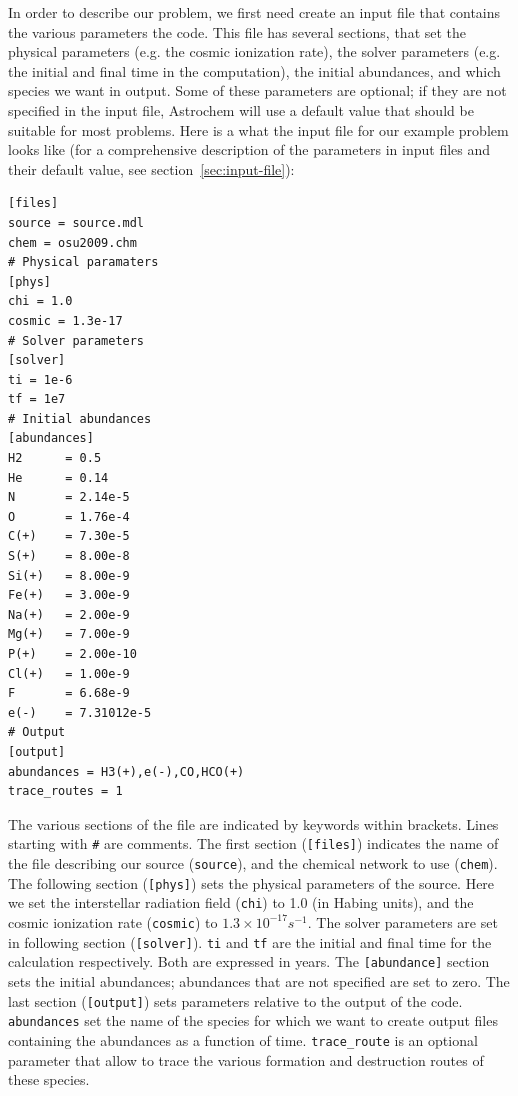 \documentclass[a4paper,12pt]{article}
\begin{document}
In order to describe our problem, we first need create an input file
that contains the various parameters the code. This file has several
sections, that set the physical parameters (e.g. the cosmic ionization
rate), the solver parameters (e.g. the initial and final time in the
computation), the initial abundances, and which species we want in
output. Some of these parameters are optional; if they are not
specified in the input file, Astrochem will use a default value that
should be suitable for most problems. Here is a what the input file
for our example problem looks like (for a comprehensive description of
the parameters in input files and their default value, see
section~\ref{sec:input-file}):

\begin{verbatim}
[files]
source = source.mdl
chem = osu2009.chm
# Physical paramaters
[phys]
chi = 1.0
cosmic = 1.3e-17
# Solver parameters
[solver]
ti = 1e-6
tf = 1e7
# Initial abundances
[abundances]
H2      = 0.5
He      = 0.14
N       = 2.14e-5
O       = 1.76e-4
C(+)    = 7.30e-5
S(+)    = 8.00e-8
Si(+)   = 8.00e-9
Fe(+)   = 3.00e-9
Na(+)   = 2.00e-9
Mg(+)   = 7.00e-9
P(+)    = 2.00e-10
Cl(+)   = 1.00e-9
F       = 6.68e-9
e(-)    = 7.31012e-5
# Output
[output]
abundances = H3(+),e(-),CO,HCO(+)
trace_routes = 1
\end{verbatim}

The various sections of the file are indicated by keywords within
brackets. Lines starting with \verb=#= are comments. The first section
(\verb=[files]=) indicates the name of the file describing our source
(\verb=source=), and the chemical network to use (\verb=chem=). The
following section (\verb=[phys]=) sets the physical parameters of the
source. Here we set the interstellar radiation field (\verb=chi=) to
1.0 (in Habing units), and the cosmic ionization rate (\verb=cosmic=)
to $1.3 \times 10^{-17} s^{-1}$. The solver parameters are set in
following section (\verb=[solver]=). \verb=ti= and \verb=tf= are the
initial and final time for the calculation respectively. Both are
expressed in years. The \verb=[abundance]= section sets the initial
abundances; abundances that are not specified are set to zero. The
last section (\verb=[output]=) sets parameters relative to the output
of the code. \verb=abundances= set the name of the species for which
we want to create output files containing the abundances as a function
of time. \verb=trace_route= is an optional parameter that allow to
trace the various formation and destruction routes of these species.
\end{document}
